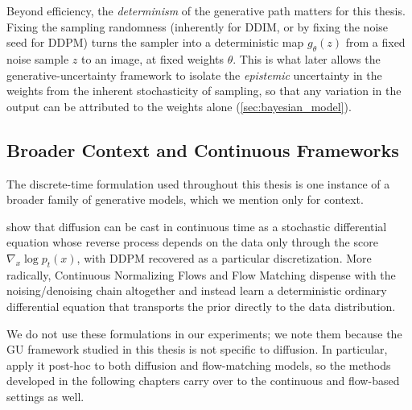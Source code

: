 Beyond efficiency, the \emph{determinism} of the generative path matters for this thesis. Fixing the sampling randomness (inherently for \acs{DDIM}, or by fixing the noise seed for \acs{DDPM}) turns the sampler into a deterministic map $g_{\theta}(z)$ from a fixed noise sample $z$ to an image, at fixed weights $\theta$. This is what later allows the generative-uncertainty framework to isolate the \emph{epistemic} uncertainty in the weights from the inherent stochasticity of sampling, so that any variation in the output can be attributed to the weights alone (\autoref{sec:bayesian_model}).

\subsection{Broader Context and Continuous Frameworks}
\label{subsec:bg_continuous}
The discrete-time formulation used throughout this thesis is one instance of a broader family of generative models, which we mention only for context. 

\textcite{song_score-based_2021} show that diffusion can be cast in continuous time as a stochastic differential equation whose reverse process depends on the data only through the score $\nabla_x \log p_t(x)$, with \acs{DDPM} recovered as a particular discretization. More radically, Continuous Normalizing Flows \parencite{chen_neural_2019} and Flow Matching \parencite{lipman_flow_2023} dispense with the noising/denoising chain altogether and instead learn a deterministic ordinary differential equation that transports the prior directly to the data distribution. 

We do not use these formulations in our experiments; we note them because the \acs{GU} framework studied in this thesis is not specific to diffusion. In particular, \textcite{jazbec_generative_2025} apply it post-hoc to both diffusion and flow-matching models, so the methods developed in the following chapters carry over to the continuous and flow-based settings as well.


